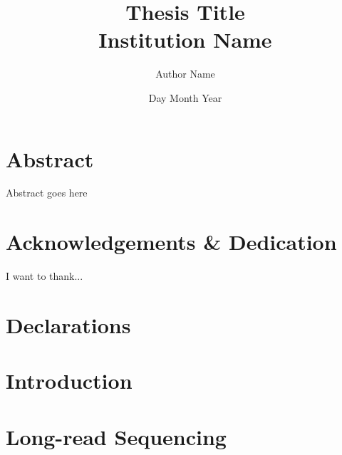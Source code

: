 \documentclass[a4paper,12pt,oneside]{report}
\begin{document}
\sloppy %
\title{
	{Thesis Title}\\
	{\large Institution Name}\\}
\author{Author Name}
\date{Day Month Year}

\normallinespacing
\maketitle
\pagestyle{plain} %

\chapter*{Abstract}
Abstract goes here

\chapter*{Acknowledgements \& Dedication}
I want to thank...

\newpage
\tableofcontents

\newpage
\listoffigures
{}

\newpage
\listoftables
{}

\newpage
\listofmyequations
{}

\chapter*{Declarations}


\newpage
\renewcommand{\nomname}{Abbreviations}
\printnomenclature 

\chapter{Introduction}


\chapter{Long-read Sequencing}\label{ch: long_read_sequencing}







\end{document}
